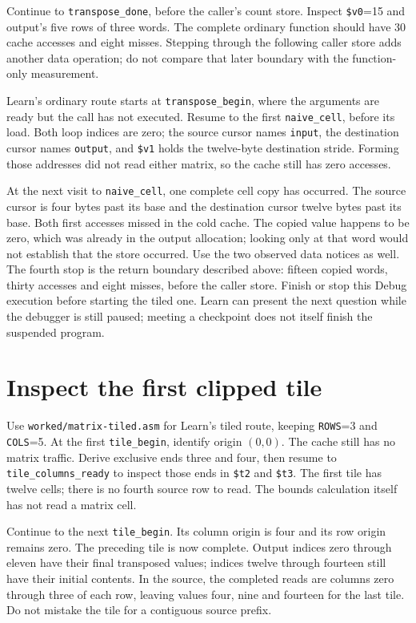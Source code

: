Continue to \texttt{transpose\_done}, before the caller's count store. Inspect
\texttt{\$v0}=15 and output's five rows of three words. The complete ordinary
function should have 30 cache accesses and eight misses. Stepping through the
following caller store adds another data operation; do not compare that later
boundary with the function-only measurement.

Learn's ordinary route starts at \texttt{transpose\_begin}, where the arguments
are ready but the call has not executed. Resume to the first
\texttt{naive\_cell}, before its load. Both loop indices are zero; the source
cursor names \texttt{input}, the destination cursor names \texttt{output},
and \texttt{\$v1} holds the twelve-byte destination stride. Forming those
addresses did not read either matrix, so the cache still has zero accesses.

At the next visit to \texttt{naive\_cell}, one complete cell copy has occurred.
The source cursor is four bytes past its base and the destination cursor twelve
bytes past its base. Both first accesses missed in the cold cache. The copied
value happens to be zero, which was already in the output allocation; looking
only at that word would not establish that the store occurred. Use the two
observed data notices as well. The fourth stop is the return boundary described
above: fifteen copied words, thirty accesses and eight misses, before the
caller store. Finish or stop this Debug execution before starting the tiled
one. Learn can present the next question while the debugger is still paused;
meeting a checkpoint does not itself finish the suspended program.

\section{Inspect the first clipped tile}

Use \texttt{worked/matrix-tiled.asm} for Learn's tiled route, keeping
\texttt{ROWS}=3 and \texttt{COLS}=5. At the first \texttt{tile\_begin}, identify
origin $(0,0)$. The cache still has no matrix traffic. Derive exclusive ends
three and four, then resume to \texttt{tile\_columns\_ready} to inspect those
ends in \texttt{\$t2} and \texttt{\$t3}. The first tile has twelve cells; there
is no fourth source row to read. The bounds calculation itself has not read
a matrix cell.

Continue to the next \texttt{tile\_begin}. Its column origin is four and its row
origin remains zero. The preceding tile is now complete. Output indices zero
through eleven have their final transposed values; indices twelve through fourteen
still have their initial contents. In the source, the completed reads are columns
zero through three of each row, leaving values four, nine and fourteen for the
last tile. Do not mistake the tile for a contiguous source prefix.

